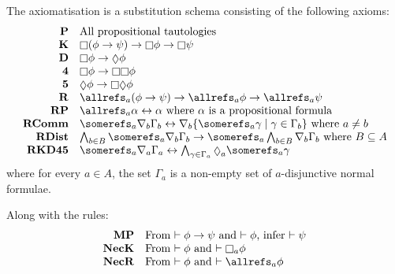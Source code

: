 \begin{definition}
The axiomatisation \axiomKDF{} is a substitution schema consisting of the
following axioms:
$$ %
\begin{array}{rl}
{\bf P} & \text{All propositional tautologies}\\
{\bf K} & \knows (\phi \implies \psi) \implies \knows \phi \implies \knows
\psi\\
{\bf D} & \knows \phi \implies \suspects \phi\\
{\bf 4} & \knows \phi \implies \knows \knows \phi\\
{\bf 5} & \suspects \phi \implies \knows \suspects \phi\\
{\bf R} & \allrefs_a (\phi \implies \psi) \implies \allrefs_a \phi \implies
\allrefs_a \psi\\
{\bf RP} & \allrefs_a \alpha \iff \alpha \text{ where $\alpha$ is a
propositional formula}\\
{\bf RComm} & \somerefs_a \covers_b \Gamma_b \iff \covers_b \{\somerefs_a \gamma
\mid \gamma \in \Gamma_b\} \text{ where $a \neq b$}\\
{\bf RDist} & \bigwedge_{b \in B} \somerefs_a \covers_b \Gamma_b \implies
\somerefs_a \bigwedge_{b \in B} \covers_b \Gamma_b \text{ where $B \subseteq A$}\\
{\bf RKD45} & \somerefs_a \covers_a \Gamma_a \iff \bigwedge_{\gamma \in
\Gamma_a} \suspects_a \somerefs_a \gamma
\end{array}
$$
where for every $a \in A$, the set $\Gamma_a$ is a non-empty set of
$a$-disjunctive normal formulae.

Along with the rules:
$$
\begin{array}{rl}
{\bf MP} & \text{From $\proves \phi \implies \psi$ and $\proves \phi$, infer
$\proves \psi$}\\
{\bf NecK} & \text{From $\proves \phi$ and $\proves \knows_a \phi$}\\
{\bf NecR} & \text{From $\proves \phi$ and $\proves \allrefs_a \phi$}
\end{array}
$$
\end{definition}

